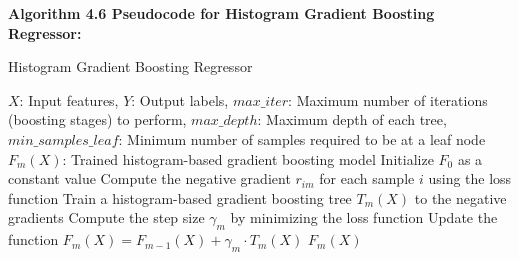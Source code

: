 \textbf{Algorithm 4.6 Pseudocode for Histogram Gradient Boosting Regressor:}
\begin{algorithm}
\caption{Histogram Gradient Boosting Regressor}
\begin{algorithmic}[1]
\Require $X$: Input features, $Y$: Output labels, $max\_iter$: Maximum number of iterations (boosting stages) to perform, $max\_depth$: Maximum depth of each tree, $min\_samples\_leaf$: Minimum number of samples required to be at a leaf node
\Ensure $F_m(X)$: Trained histogram-based gradient boosting model
    \State Initialize $F_0$ as a constant value
        \State Compute the negative gradient $r_{im}$ for each sample $i$ using the loss function
        \State Train a histogram-based gradient boosting tree $T_m(X)$ to the negative gradients
        \State Compute the step size $\gamma_m$ by minimizing the loss function
        \State Update the function $F_m(X) = F_{m-1}(X) + \gamma_m \cdot T_m(X)$
    \EndFor
    \State \Return $F_m(X)$
\EndFunction
\end{algorithmic}
\end{algorithm}